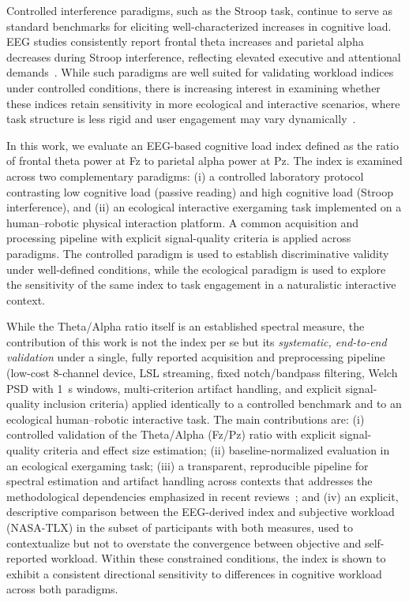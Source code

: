 \documentclass[conference]{IEEEtran}
\begin{document}
Controlled interference paradigms, such as the Stroop task, continue to serve as standard benchmarks for eliciting well-characterized increases in cognitive load. EEG studies consistently report frontal theta increases and parietal alpha decreases during Stroop interference, reflecting elevated executive and attentional demands~\cite{c5,c9}. While such paradigms are well suited for validating workload indices under controlled conditions, there is increasing interest in examining whether these indices retain sensitivity in more ecological and interactive scenarios, where task structure is less rigid and user engagement may vary dynamically~\cite{c2,c3}.

In this work, we evaluate an EEG-based cognitive load index defined as the ratio of frontal theta power at Fz to parietal alpha power at Pz. The index is examined across two complementary paradigms: (i) a controlled laboratory protocol contrasting low cognitive load (passive reading) and high cognitive load (Stroop interference), and (ii) an ecological interactive exergaming task implemented on a human--robotic physical interaction platform. A common acquisition and processing pipeline with explicit signal-quality criteria is applied across paradigms. The controlled paradigm is used to establish discriminative validity under well-defined conditions, while the ecological paradigm is used to explore the sensitivity of the same index to task engagement in a naturalistic interactive context.

While the Theta/Alpha ratio itself is an established spectral measure, the contribution of this work is not the index per se but its \emph{systematic, end-to-end validation} under a single, fully reported acquisition and preprocessing pipeline (low-cost 8-channel device, LSL streaming, fixed notch/bandpass filtering, Welch PSD with 1~s windows, multi-criterion artifact handling, and explicit signal-quality inclusion criteria) applied identically to a controlled benchmark and to an ecological human--robotic interactive task. The main contributions are: (i) controlled validation of the Theta/Alpha (Fz/Pz) ratio with explicit signal-quality criteria and effect size estimation; (ii) baseline-normalized evaluation in an ecological exergaming task; (iii) a transparent, reproducible pipeline for spectral estimation and artifact handling across contexts that addresses the methodological dependencies emphasized in recent reviews~\cite{c4,c6}; and (iv) an explicit, descriptive comparison between the EEG-derived index and subjective workload (NASA-TLX) in the subset of participants with both measures, used to contextualize but not to overstate the convergence between objective and self-reported workload. Within these constrained conditions, the index is shown to exhibit a consistent directional sensitivity to differences in cognitive workload across both paradigms.
\end{document}
